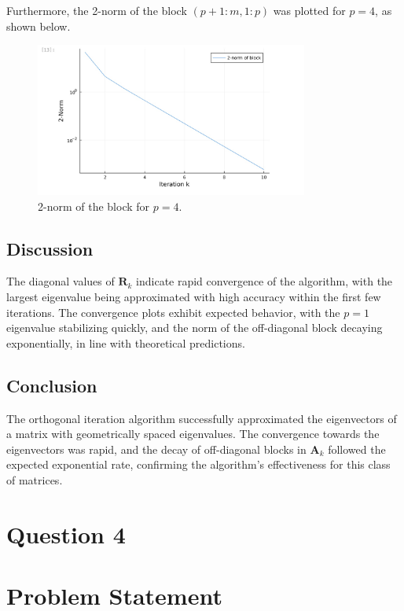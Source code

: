 \documentclass{article}
\begin{document}
Furthermore, the 2-norm of the block $(p+1: m, 1: p)$ was plotted for $p=4$, as shown below.

\begin{figure}[H]
    \centering
    \includegraphics[width=0.8\textwidth]{HW5 photos/Image 3-31-24 at 17.34.jpeg}
    \caption{2-norm of the block for $p=4$.}
    \label{fig:2norm_block_p4}
\end{figure}

\subsection{Discussion}
The diagonal values of $\mathbf{R}_k$ indicate rapid convergence of the algorithm, with the largest eigenvalue being approximated with high accuracy within the first few iterations. The convergence plots exhibit expected behavior, with the $p=1$ eigenvalue stabilizing quickly, and the norm of the off-diagonal block decaying exponentially, in line with theoretical predictions.

\subsection{Conclusion}
The orthogonal iteration algorithm successfully approximated the eigenvectors of a matrix with geometrically spaced eigenvalues. The convergence towards the eigenvectors was rapid, and the decay of off-diagonal blocks in $\mathbf{A}_k$ followed the expected exponential rate, confirming the algorithm's effectiveness for this class of matrices.

\section{Question 4}
\section*{Problem Statement}
\end{document}
